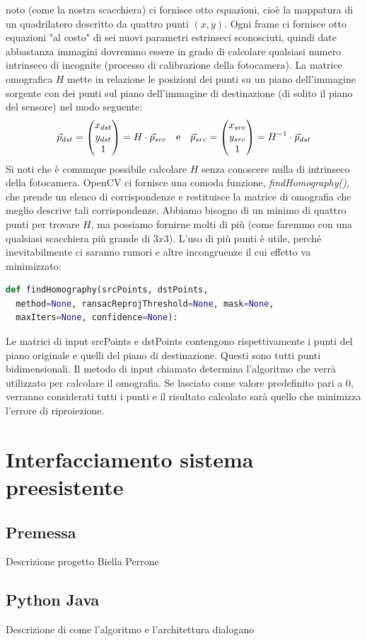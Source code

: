 \documentclass[twoside]{supsistudent}
\begin{document}
noto (come la nostra scacchiera) ci fornisce otto equazioni, cioè la mappatura di un quadrilatero descritto da quattro punti $(x, y)$. Ogni frame ci fornisce 
otto equazioni "al costo" di sei nuovi parametri estrinseci sconosciuti, quindi date abbastanza immagini dovremmo essere in grado di calcolare qualsiasi 
numero intrinseco di incognite (processo di calibrazione della fotocamera). 
La matrice omografica $H$ mette in relazione le posizioni dei punti su un piano dell'immagine sorgente con dei punti sul piano dell'immagine di destinazione 
(di solito il piano del sensore) nel modo seguente:
\[\vec{p}_{dst} = \Spvek[c]{x_{dst};y_{dst};1} = H \cdot \vec{p}_{src} \quad \text{e} \quad \vec{p}_{src} = \Spvek[c]{x_{src};y_{src};1} = H^{-1} \cdot \vec{p}_{dst} \]
Si noti che è comunque possibile calcolare $H$ senza conoscere nulla di intrinseco della fotocamera.
OpenCV ci fornisce una comoda funzione, \textit{findHomography()}, che prende un elenco di corrispondenze e restituisce la matrice di omografia che meglio descrive tali corrispondenze. 
Abbiamo bisogno di un minimo di quattro punti per trovare $H$, ma possiamo fornirne molti di più (come faremmo con una qualsiasi scacchiera più grande di $3 x 3$). L'uso di più punti è 
utile, perché inevitabilmente ci saranno rumori e altre incongruenze il cui effetto va minimizzato:
\begin{lstlisting}[language=Python]
  def findHomography(srcPoints, dstPoints, 
  method=None, ransacReprojThreshold=None, mask=None, 
  maxIters=None, confidence=None):
\end{lstlisting}
Le matrici di input srcPoints e dstPoints contengono rispettivamente i punti del piano originale e quelli del piano di destinazione. 
Questi sono tutti punti bidimensionali. Il metodo di input chiamato determina l'algoritmo che verrà utilizzato per calcolare il omografia. 
Se lasciato come valore predefinito pari a 0, verranno considerati tutti i punti e il risultato calcolato sarà quello che minimizza l'errore di riproiezione.
\section{Interfacciamento sistema preesistente}
\subsection{Premessa}
Descrizione progetto Biella Perrone
\subsection{Python Java}
Descrizione di come l'algoritmo e l'architettura dialogano
\end{document}

